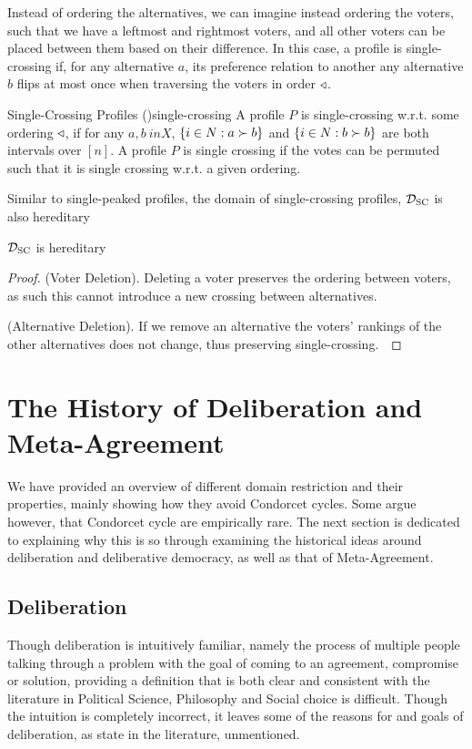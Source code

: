 Instead of ordering the alternatives, we can imagine instead ordering the voters, such that we have a leftmost and rightmost voters, and all other voters can be placed between them based on their difference. In this case, a profile is single-crossing if, for any alternative $a$, its preference relation to another any alternative $b$ flips at most once when traversing the voters in order $\triangleleft$.

\begin{definition}{Single-Crossing Profiles \textnormal{(\citet{elkindPreferenceRestrictionsComputational2022a})}}{single-crossing}
	A profile $P$ is single-crossing w.r.t. some ordering $\triangleleft$, if for any $a,b \ in X$, $\{i \in N : a \succ b\}$ and $\{i \in N: b \succ b\}$ are both intervals over $[n]$. A profile $P$ is single crossing if the votes can be permuted such that it is single crossing w.r.t. a given ordering.
\end{definition}

Similar to single-peaked profiles, the domain of single-crossing profiles, $\mathcal{D}_{\textnormal{SC}}$ is also hereditary

\begin{proposition}
	$\mathcal{D}_{\textnormal{SC}}$ is hereditary
\end{proposition}

\begin{proof}
	(Voter Deletion). Deleting a voter preserves the ordering between voters, as such this cannot introduce a new crossing between alternatives.~\checkmark

	(Alternative Deletion). If we remove an alternative the voters' rankings of the other alternatives does not change, thus preserving single-crossing.~\checkmark
\end{proof}

\section{The History of Deliberation and Meta-Agreement}

We have provided an overview of different domain restriction and their properties, mainly showing how they avoid Condorcet cycles. Some argue however, that Condorcet cycle are empirically rare. The next section is dedicated to explaining why this is so through examining the historical ideas around deliberation and deliberative democracy, as well as that of Meta-Agreement.

\subsection{Deliberation}
Though deliberation is intuitively familiar, namely the process of multiple people talking through a problem with the goal of coming to an agreement, compromise or solution, providing a definition that is both clear and consistent with the literature in Political Science, Philosophy and Social choice is difficult. Though the intuition is completely incorrect, it leaves some of the reasons for and goals of deliberation, as state in the literature, unmentioned.


